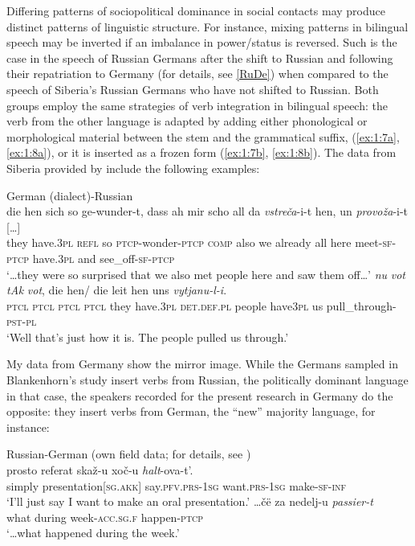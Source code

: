 Differing patterns of sociopolitical dominance in social contacts may produce distinct patterns of linguistic structure. For instance, mixing patterns in bilingual speech may be inverted if an imbalance in power/status is reversed. Such is the case in the speech of Russian Germans after the shift to Russian and following their repatriation to Germany (for details, see \ref{RuDe}) when compared to the speech of Siberia's Russian Germans who have not shifted to Russian. Both groups employ the same strategies of verb integration in bilingual speech: the verb from the other language is adapted by adding either phonological or morphological material between the stem and the grammatical suffix, (\ref{ex:1:7a}, \ref{ex:1:8a}), or it is inserted as a frozen form (\ref{ex:1:7b}, \ref{ex:1:8b}). The data from Siberia provided by \citet[][]{blankenhorn} include the following examples:

\ea
German (dialect)-Russian \citep[][103,93]{blankenhorn}\\
\ea{\label{ex:1:7a}}
\gll [\dots] die hen sich so ge-wunder-t, dass ah mir scho all da \textit{vstreča}-i-t hen, un \textit{provoža}-i-t [\dots] \\
    {} they have.\textsc{3pl} \textsc{refl} so \textsc{ptcp}-wonder-\textsc{ptcp} \textsc{comp} also we already all here 
    meet-\textsc{sf-ptcp} have.\textsc{3pl} and see\_off-\textsc{sf-ptcp}\\
\glt `\dots they were so surprised that we also met people here and saw them off\dots'
\ex{\label{ex:1:7b}}
\gll [\dots] \textit{nu} \textit{vot} \textit{tAk} \textit{vot}, die hen/ die leit hen uns \textit{vytjanu-l-i}.\\
	{} \textsc{ptcl} \textsc{ptcl} \textsc{ptcl} \textsc{ptcl} they have.\textsc{3pl} \textsc{det.def.pl} people have\textsc{3pl} us pull\_through-\textsc{pst-pl}\\
\glt `Well that's just how it is. The people pulled us through.'
\z
\z

\noindent My data from Germany show the mirror image. While the Germans sampled in Blankenhorn's \citeyear[][]{blankenhorn} study insert verbs from Russian, the politically dominant language in that case, the speakers recorded for the present research in Germany do the opposite: they insert verbs from German, the ``new'' majority language, for instance:

\ea
Russian-German (own field data; for details, see )\\
\ea{\label{ex:1:8a}}
\gll prosto referat skaž-u xoč-u \textit{halt}-ova-t’.\\
	simply presentation[\textsc{sg.akk}] say.\textsc{pfv.prs-1sg} want.\textsc{prs-1sg}   make-\textsc{sf-inf}\\
\glt `I'll just say I want to make an oral presentation.'
\ex{\label{ex:1:8b}}
\gll \dots čë za nedelj-u \textit{passier-t}\\
    what during week-\textsc{acc.sg.f} happen-\textsc{ptcp}\\
\glt `\dots what happened during the week.'
\z
\z


